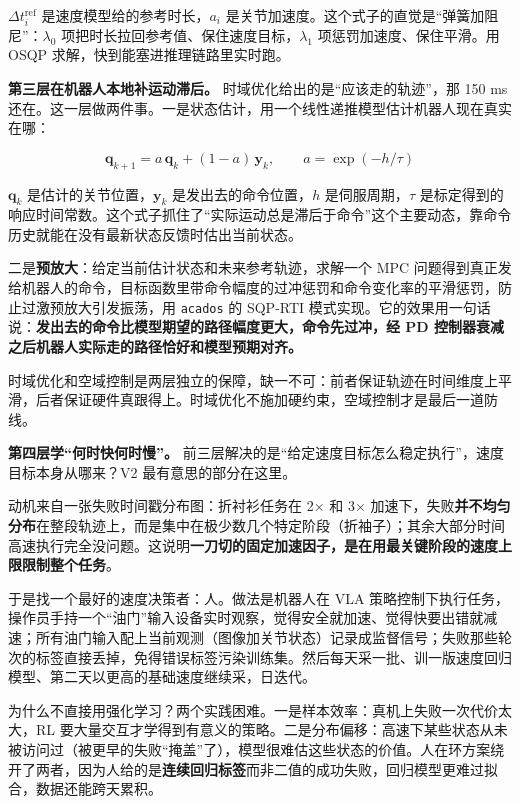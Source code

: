 \documentclass[
  chinese,
]{ctexart}
\begin{document}
\(\Delta t_i^{\text{ref}}\) 是速度模型给的参考时长，\(a_i\)
是关节加速度。这个式子的直觉是``弹簧加阻尼''：\(\lambda_0\)
项把时长拉回参考值、保住速度目标，\(\lambda_1\)
项惩罚加速度、保住平滑。用 OSQP 求解，快到能塞进推理链路里实时跑。

\textbf{第三层在机器人本地补运动滞后。}
时域优化给出的是``应该走的轨迹''，那 150 ms
还在。这一层做两件事。一是状态估计，用一个线性递推模型估计机器人现在真实在哪：

\[\mathbf{q}_{k+1} = a\,\mathbf{q}_k + (1-a)\,\mathbf{y}_k, \qquad a = \exp(-h/\tau)\]

\(\mathbf{q}_k\) 是估计的关节位置，\(\mathbf{y}_k\)
是发出去的命令位置，\(h\) 是伺服周期，\(\tau\)
是标定得到的响应时间常数。这个式子抓住了``实际运动总是滞后于命令''这个主要动态，靠命令历史就能在没有最新状态反馈时估出当前状态。

二是\textbf{预放大}：给定当前估计状态和未来参考轨迹，求解一个 MPC
问题得到真正发给机器人的命令，目标函数里带命令幅度的过冲惩罚和命令变化率的平滑惩罚，防止过激预放大引发振荡，用
\texttt{acados} 的 SQP-RTI
模式实现。它的效果用一句话说：\textbf{发出去的命令比模型期望的路径幅度更大，命令先过冲，经
PD 控制器衰减之后机器人实际走的路径恰好和模型预期对齐。}

时域优化和空域控制是两层独立的保障，缺一不可：前者保证轨迹在时间维度上平滑，后者保证硬件真跟得上。时域优化不施加硬约束，空域控制才是最后一道防线。

\textbf{第四层学``何时快何时慢''。}
前三层解决的是``给定速度目标怎么稳定执行''，速度目标本身从哪来？V2
最有意思的部分在这里。

动机来自一张失败时间戳分布图：折衬衫任务在 2× 和 3×
加速下，失败\textbf{并不均匀分布}在整段轨迹上，而是集中在极少数几个特定阶段（折袖子）；其余大部分时间高速执行完全没问题。这说明\textbf{一刀切的固定加速因子，是在用最关键阶段的速度上限限制整个任务}。

于是找一个最好的速度决策者：人。做法是机器人在 VLA
策略控制下执行任务，操作员手持一个``油门''输入设备实时观察，觉得安全就加速、觉得快要出错就减速；所有油门输入配上当前观测（图像加关节状态）记录成监督信号；失败那些轮次的标签直接丢掉，免得错误标签污染训练集。然后每天采一批、训一版速度回归模型、第二天以更高的基础速度继续采，日迭代。

为什么不直接用强化学习？两个实践困难。一是样本效率：真机上失败一次代价太大，RL
要大量交互才学得到有意义的策略。二是分布偏移：高速下某些状态从未被访问过（被更早的失败``掩盖''了），模型很难估这些状态的价值。人在环方案绕开了两者，因为人给的是\textbf{连续回归标签}而非二值的成功失败，回归模型更难过拟合，数据还能跨天累积。
\end{document}
